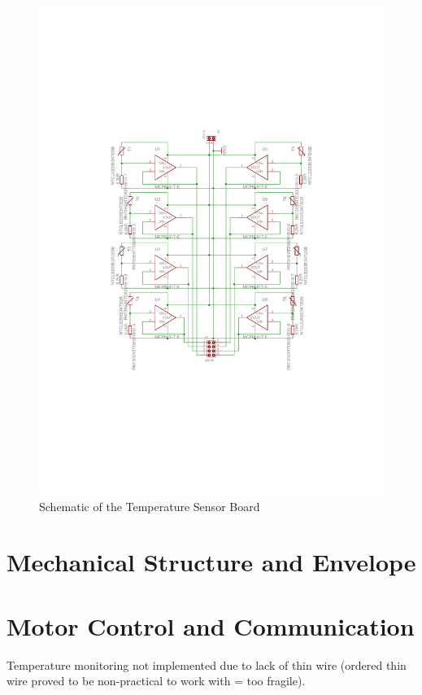 \begin{figure}[H]
\centering
\includegraphics[width=\textwidth]{figures/fig_Schematic_TS}
\caption{Schematic of the Temperature Sensor Board}
\label{fig:Schematic_TS}
\end{figure}


\section{Mechanical Structure and Envelope}

\section{Motor Control and Communication}

Temperature monitoring not implemented due to lack of thin wire (ordered thin wire proved to be non-practical to work with = too fragile).


